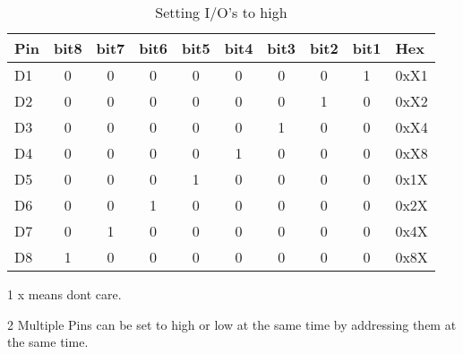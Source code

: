 \documentclass[10pt]{datasheet}
\begin{document}
\begin{table}[h]
\begin{threeparttable}
\caption{Setting I/O's to high}
\label{table:Pin_state_map}
\begin{tabularx}{\textwidth}{l | c | c | c | c | c | c | c | c | X}
    \thickhline
    \textbf{Pin}	& \textbf{bit8}	& \textbf{bit7}	& \textbf{bit6}	& \textbf{bit5}	& \textbf{bit4}	& \textbf{bit3}	& \textbf{bit2}	& \textbf{bit1} 	& \textbf{Hex} \\
    \hline
    D1	&	0	&	0	&	0	&	0	&	0	&	0	&	0	&	1 	& 0xX1 \\
    \hline
    D2	&	0	&	0	&	0	&	0	&	0	&	0	&	1	&	0	& 0xX2 \\
    \hline
    D3	&	0	&	0	&	0	&	0	&	0	&	1	&	0	&	0	& 0xX4 \\
    \hline
    D4	&	0	&	0	&	0	&	0	&	1	&	0	&	0	&	0	& 0xX8 \\
    \hline
    D5	&	0	&	0	&	0	&	1	&	0	&	0	&	0	&	0	& 0x1X \\
    \hline
    D6	&	0	&	0	&	1	&	0	&	0	&	0	&	0	&	0	& 0x2X \\
    \hline
    D7	&	0	&	1	&	0	&	0	&	0	&	0	&	0	&	0	& 0x4X \\
    \hline
    D8	&	1	&	0	&	0	&	0	&	0	&	0	&	0	&	0	& 0x8X \\
\end{tabularx}
\begin{tablenotes}
\item[1]{x means dont care.}
\item[2]{Multiple Pins can be set to high or low at the same time by addressing them at the same time.}
\end{tablenotes}
\end{threeparttable}
\end{table}
\end{document}
